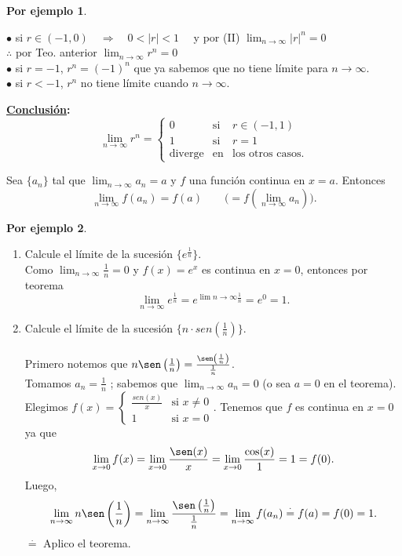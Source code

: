 \documentclass{article}
\theoremstyle{definition}
\newtheorem*{ej}{Por ejemplo}
\theoremstyle{remark}
\begin{document}
\begin{ej}
\begin{enumerate}
        $\bullet$ si $r \in (-1,0)\quad \Rightarrow \quad 0<|r|<1 \quad$ y por (II) $\lim_{n \to \infty}{|r|^n}=0$ \\ $\therefore$ por Teo. anterior $\lim_{n \to \infty}{r^n}=0$ \\
        $\bullet$ si $r = -1$, $r^n=(-1)^n$ que ya sabemos que no tiene límite para $n \to \infty$. \\
        $\bullet$ si $r< -1$, $r^n$ no tiene límite cuando $n \to \infty$. 
    \end{enumerate}
\textbf{\underline{Conclusión}:}
\[ 
  \lim_{n \to \infty}{r^n} = \left\{ 
    \begin{array}{lcl}
      0 & \text{si} & r \in (-1,1) \\
      1 &\text{si} & r=1 \\
      \text{diverge} & \text{en} & \text{los otros casos.}
    \end{array}
  \right.
\]
\end{ej}

\begin{teo}
  Sea $\{ a_n \}$ tal que $\lim_{n \to \infty }{a_n}=a$ y $f$ una función continua en $x=a$. Entonces \[ 
    \lim_{n \to \infty}{f(a_n)}=f(a) \quad \quad \big(=f(\lim_{n \to \infty}{a_n})\big).
  \]
\end{teo}
\begin{ej} \; \\
    \begin{enumerate}
      \item Calcule el límite de la sucesión $\{e^{\frac{1}{n}}\}$. \\
        Como $\lim_{n \to \infty}{\frac{1}{n}}=0$ y $f(x)=e^x$ es continua en $x=0$, entonces por teorema \[ 
          \lim_{n \to \infty}{e^{\frac{1}{n}}}=e^{\lim{n\to\infty}{\frac{1}{n}}}=e^0=1.
        \]
      \item  Calcule el límite de la sucesión $\{ n \cdot sen\left(\frac{1}{n}\right)\}$. \\\\
        Primero notemos que $n\sen\left(\frac{1}{n}\right)=\frac{\sen\left(\frac{1}{n}\right)}{\frac{1}{n}}$.\\
        Tomamos $a_n=\frac{1}{n}$ ; sabemos que $\lim_{n \to \infty}{a_n}=0$ (o sea $a=0$ en el teorema). \\
        Elegimos $ f(x)=\left\{ \begin{array}{cl}
            \frac{sen(x)}{x} & \text{si } x \neq 0 \\
            1                & \text{si } x=0
        \end{array}. \right. $ 
        Tenemos que $f$ es continua en $x=0$ ya que \[\lim_{x\to 0}{f(x)}=\lim_{x \to 0}{\frac{\sen(x)}{x}}=\lim_{x \to 0}{\frac{\cos(x)}{1}}=1=f(0).
        \]
      Luego, \[
      \lim_{n \to \infty}{n\sen\left(\frac{1}{n}\right)}=\lim_{n \to \infty}{\frac{\sen\left(\frac{1}{n}\right)}{\frac{1}{n}}}=\lim_{n \to \infty }{f(a_n)}\overset{\cdot}{=}f(a)=f(0)=1. \]
      $\overset{\cdot}{=}$ Aplico el teorema.

    \end{enumerate}
\end{ej}
\end{document}
